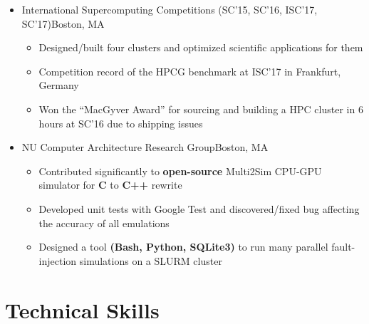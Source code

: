 \documentclass[11pt,letterpaper,sans]{moderncv}
\begin{document}
\begin{itemize}

\item[] {
{International Supercomputing Competitions (SC'15, SC'16, ISC'17, SC'17)}{Boston, MA}{}{\vspace{1pt}}
\vspace{-8pt}	\begin{itemize}
		\item Designed/built four clusters and optimized scientific applications for them
		\item Competition record of the HPCG benchmark at ISC'17 in Frankfurt, Germany
		\item Won the ``MacGyver Award'' for sourcing and building a HPC cluster in 6 hours at SC'16 due to shipping issues
		\end{itemize}
}
\vspace{6pt}


\item[] {
{NU Computer Architecture Research Group}{Boston, MA}{}{\vspace{1pt}}
\vspace{-8pt}	\begin{itemize}
		\item Contributed significantly to \textbf{open-source} Multi2Sim CPU-GPU simulator for \textbf{C} to \textbf{C++} rewrite
		\item Developed unit tests with Google Test and discovered/fixed bug affecting the accuracy of all emulations 
		\item Designed a tool \textbf{(Bash, Python, SQLite3)} to run many parallel fault-injection simulations on a SLURM cluster
		\end{itemize}
		
}

\end{itemize}
\vspace{-6pt}


\section{Technical Skills}
\end{document}
